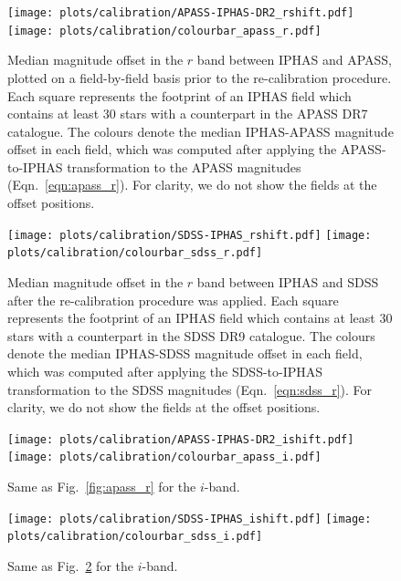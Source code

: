 \documentclass[useAMS,usenatbib]{mn2e}
\begin{document}
\begin{figure}
    \texttt{[image: plots/calibration/APASS-IPHAS-DR2\_rshift.pdf]} 
    \texttt{[image: plots/calibration/colourbar\_apass\_r.pdf]} 
    \caption{Median magnitude offset in the $r$ band between IPHAS and APASS,
             plotted on a field-by-field basis
             prior to the re-calibration procedure.
             Each square represents the footprint of an IPHAS field
             which contains at least 30 stars with a counterpart
             in the APASS DR7 catalogue.
             The colours denote the median
             IPHAS-APASS magnitude offset in each field,
             which was computed after applying the APASS-to-IPHAS
             transformation to the APASS magnitudes (Eqn.~\ref{eqn:apass_r}).
             For clarity, we do not show the fields at the offset positions.}
        \label{fig:apass_r}
    \vspace{1cm}
    \texttt{[image: plots/calibration/SDSS-IPHAS\_rshift.pdf]}
    \texttt{[image: plots/calibration/colourbar\_sdss\_r.pdf]} 
    \caption{Median magnitude offset in the $r$ band
             between IPHAS and SDSS after the re-calibration
             procedure was applied.
             Each square represents the footprint of an IPHAS field
             which contains at least 30 stars
             with a counterpart in the SDSS DR9 catalogue.
             The colours denote the median IPHAS-SDSS magnitude offset
             in each field,
             which was computed after applying the SDSS-to-IPHAS
             transformation to the SDSS magnitudes (Eqn.~\ref{eqn:sdss_r}).
             For clarity, we do not show the fields at the offset positions.}
    \label{fig:sdss_r}
\end{figure}

\begin{figure}
	\vspace{2cm}
    \texttt{[image: plots/calibration/APASS-IPHAS-DR2\_ishift.pdf]} 
    \texttt{[image: plots/calibration/colourbar\_apass\_i.pdf]} 
    \caption{Same as Fig.~\ref{fig:apass_r} for the $i$-band.}
        \label{fig:apass_i}
    \vspace{1cm}
    \texttt{[image: plots/calibration/SDSS-IPHAS\_ishift.pdf]}
    \texttt{[image: plots/calibration/colourbar\_sdss\_i.pdf]} 
    \caption{Same as Fig.~\ref{fig:sdss_i} for the $i$-band.}
    \label{fig:sdss_i}
\end{figure}
\end{document}

